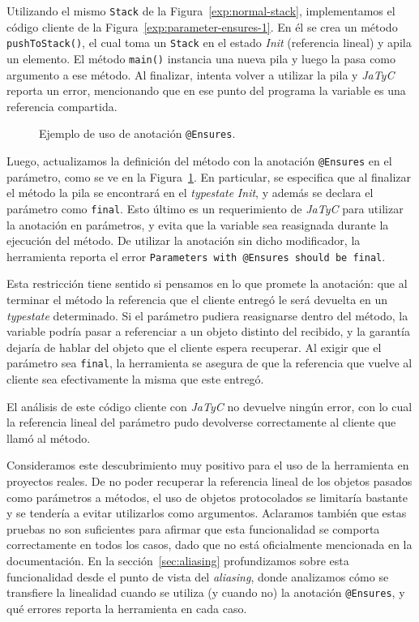 Utilizando el mismo \texttt{Stack} de la Figura~\ref{exp:normal-stack}, implementamos el código cliente de la Figura~\ref{exp:parameter-ensures-1}. En él se crea un método \texttt{pushToStack()}, el cual toma un \texttt{Stack} en el estado \textit{Init} (referencia lineal) y apila un elemento. El método \texttt{main()} instancia una nueva pila y luego la pasa como argumento a ese método. Al finalizar, intenta volver a utilizar la pila y \textit{JaTyC} reporta un error, mencionando que en ese punto del programa la variable es una referencia compartida.

\begin{figure}[htbp]
    \centering
    
    \caption{Ejemplo de uso de anotación \texttt{@Ensures}.}
    \label{exp:parameter-ensures-2}
\end{figure}

Luego, actualizamos la definición del método con la anotación \texttt{@Ensures} en el parámetro, como se ve en la Figura~\ref{exp:parameter-ensures-2}. En particular, se especifica que al finalizar el método la pila se encontrará en el \textit{typestate} \textit{Init}, y además se declara el parámetro como \texttt{final}. Esto último es un requerimiento de \textit{JaTyC} para utilizar la anotación en parámetros, y evita que la variable sea reasignada durante la ejecución del método. De utilizar la anotación sin dicho modificador, la herramienta reporta el error \texttt{Parameters with @Ensures should be final}.

Esta restricción tiene sentido si pensamos en lo que promete la anotación: que al terminar el método la referencia que el cliente entregó le será devuelta en un \textit{typestate} determinado. Si el parámetro pudiera reasignarse dentro del método, la variable podría pasar a referenciar a un objeto distinto del recibido, y la garantía dejaría de hablar del objeto que el cliente espera recuperar. Al exigir que el parámetro sea \texttt{final}, la herramienta se asegura de que la referencia que vuelve al cliente sea efectivamente la misma que este entregó.

El análisis de este código cliente con \textit{JaTyC} no devuelve ningún error, con lo cual la referencia lineal del parámetro pudo devolverse correctamente al cliente que llamó al método.

Consideramos este descubrimiento muy positivo para el uso de la herramienta en proyectos reales. De no poder recuperar la referencia lineal de los objetos pasados como parámetros a métodos, el uso de objetos protocolados se limitaría bastante y se tendería a evitar utilizarlos como argumentos. Aclaramos también que estas pruebas no son suficientes para afirmar que esta funcionalidad se comporta correctamente en todos los casos, dado que no está oficialmente mencionada en la documentación. En la sección~\ref{sec:aliasing} profundizamos sobre esta funcionalidad desde el punto de vista del \textit{aliasing}, donde analizamos cómo se transfiere la linealidad cuando se utiliza (y cuando no) la anotación \texttt{@Ensures}, y qué errores reporta la herramienta en cada caso.

